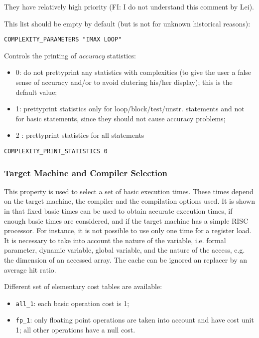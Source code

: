 They have relatively high priority (FI: I do not understand this comment
by Lei).

This list should be empty by default (but is not for unknown historical
reasons):

\begin{verbatim}
COMPLEXITY_PARAMETERS "IMAX LOOP"
\end{verbatim}

Controls the printing of {\em accuracy} statistics:

\begin{itemize}

  \item 0: do not prettyprint any statistics with complexities (to give
the user a false sense of accuracy and/or to avoid clutering his/her
display); this is the default value;

  \item 1: prettyprint statistics only for loop/block/test/unstr.
statements and not for basic statements, since they should not cause
accuracy problems;

  \item 2 : prettyprint statistics for all statements

\end{itemize}

\begin{verbatim}
COMPLEXITY_PRINT_STATISTICS 0
\end{verbatim}

\subsubsection{Target Machine and Compiler Selection}

This property is used to select a set of basic execution times. These
times depend on the target machine, the compiler and the compilation
options used. It is shown in \cite{Z94} that fixed basic times can be
used to obtain accurate execution times, if enough basic times are
considered, and if the target machine has a simple RISC processor. For
instance, it is not possible to use only one time for a register
load. It is necessary to take into account the nature of the variable,
i.e. formal parameter, dynamic variable, global variable, and the nature
of the access, e.g. the dimension of an accessed array. The cache can be
ignored an replacer by an average hit ratio.

Different set of elementary cost tables are available:

\begin{itemize}

  \item \verb+all_1+: each basic operation cost is 1;

  \item \verb+fp_1+: only floating point operations are taken into
account and have cost unit 1; all other operations have a null cost.

\end{itemize}

